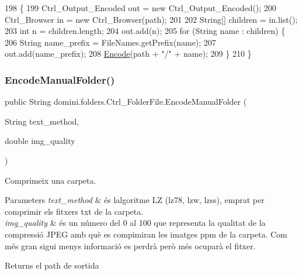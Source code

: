 \begin{DoxyCode}
198                                            \{
199         Ctrl\_Output\_Encoded out = \textcolor{keyword}{new} Ctrl\_Output\_Encoded();
200         Ctrl\_Browser in = \textcolor{keyword}{new} Ctrl\_Browser(path);
201 
202         String[] children = in.list();
203         \textcolor{keywordtype}{int} n = children.length;
204         out.add(n);
205         \textcolor{keywordflow}{for} (String name : children) \{
206             String name\_prefix = FileNames.getPrefix(name);
207             out.add(name\_prefix);
208             \hyperlink{classdomini_1_1folders_1_1Ctrl__FolderFile_a7c47fd5127ae6f713a4fa7f75002a6f6}{Encode}(path + \textcolor{stringliteral}{"/"} + name);
209         \}
210     \}
\end{DoxyCode}
\mbox{\label{classdomini_1_1folders_1_1Ctrl__FolderFile_a8cb5f1a979d5882dd244d69806d5b237}} 
\subsubsection{\texorpdfstring{Encode\+Manual\+Folder()}{EncodeManualFolder()}}
{\footnotesize\ttfamily public String domini.\+folders.\+Ctrl\+\_\+\+Folder\+File.\+Encode\+Manual\+Folder (\begin{DoxyParamCaption}\item[{String}]{text\+\_\+method,  }\item[{double}]{img\+\_\+quality }\end{DoxyParamCaption})\hspace{0.3cm}{\ttfamily [inline]}}



Comprimeix una carpeta. 


\begin{DoxyParams}{Parameters}
{\em text\+\_\+method} & és l\textquotesingle{}algoritme LZ (lz78, lzw, lzss), emprat per comprimir els fitxers txt de la carpeta. \\
\hline
{\em img\+\_\+quality} & és un número del 0 al 100 que representa la qualitat de la compressió J\+P\+EG amb què es compimiran les imatges ppm de la carpeta. Com més gran sigui menys informació es perdrà però més ocuparà el fitxer. \\
\hline
\end{DoxyParams}
\begin{DoxyReturn}{Returns}
el path de sortida 
\end{DoxyReturn}

